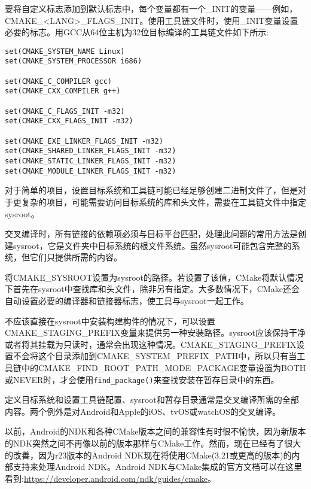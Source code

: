 要将自定义标志添加到默认标志中，每个变量都有一个\_INIT的变量——例如，CMAKE\_<LANG>\_FLAGS\_INIT。使用工具链文件时，使用\_INIT变量设置必要的标志。用GCC从64位主机为32位目标编译的工具链文件如下所示:

\begin{lstlisting}[style=styleCMake]
set(CMAKE_SYSTEM_NAME Linux)
set(CMAKE_SYSTEM_PROCESSOR i686)

set(CMAKE_C_COMPILER gcc)
set(CMAKE_CXX_COMPILER g++)

set(CMAKE_C_FLAGS_INIT -m32)
set(CMAKE_CXX_FLAGS_INIT -m32)

set(CMAKE_EXE_LINKER_FLAGS_INIT -m32)
set(CMAKE_SHARED_LINKER_FLAGS_INIT -m32)
set(CMAKE_STATIC_LINKER_FLAGS_INIT -m32)
set(CMAKE_MODULE_LINKER_FLAGS_INIT -m32)
\end{lstlisting}

对于简单的项目，设置目标系统和工具链可能已经足够创建二进制文件了，但是对于更复杂的项目，可能需要访问目标系统的库和头文件，需要在工具链文件中指定sysroot。


交叉编译时，所有链接的依赖项必须与目标平台匹配，处理此问题的常用方法是创建sysroot，它是文件夹中目标系统的根文件系统。虽然sysroot可能包含完整的系统，但它们只提供所需的内容。

将CMAKE\_SYSROOT设置为sysroot的路径。若设置了该值，CMake将默认情况下首先在sysroot中查找库和头文件，除非另有指定。大多数情况下，CMake还会自动设置必要的编译器和链接器标志，使工具与sysroot一起工作。

不应该直接在sysroot中安装构建构件的情况下，可以设置CMAKE\_STAGING\_PREFIX变量来提供另一种安装路径。sysroot应该保持干净或者将其挂载为只读时，通常会出现这种情况。CMAKE\_STAGING\_PREFIX设置不会将这个目录添加到CMAKE\_SYSTEM\_PREFIX\_PATH中，所以只有当工具链中的CMAKE\_FIND\_ROOT\_PATH\_MODE\_PACKAGE变量设置为BOTH或NEVER时，才会使用\texttt{find\_package()}来查找安装在暂存目录中的东西。

定义目标系统和设置工具链配置、sysroot和暂存目录通常是交叉编译所需的全部内容。两个例外是对Android和Apple的iOS、tvOS或watchOS的交叉编译。


以前，Android的NDK和各种CMake版本之间的兼容性有时很不愉快，因为新版本的NDK突然之间不再像以前的版本那样与CMake工作。然而，现在已经有了很大的改善，因为r23版本的Android NDK现在将使用CMake(3.21或更高的版本)的内部支持来处理Android NDK。Android NDK与CMake集成的官方文档可以在这里看到:\url{https://developer.android.com/ndk/guides/cmake}。

